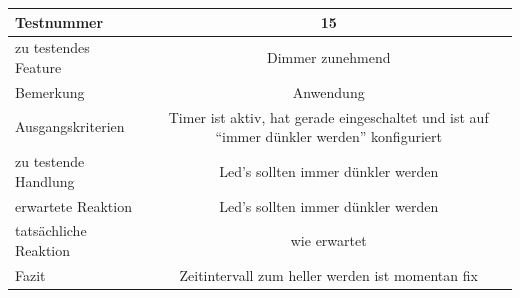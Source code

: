 \documentclass[]{article}
\begin{document}
\begin{longtable}[]{@{}lc@{}}
\toprule
\begin{minipage}[b]{0.25\columnwidth}\raggedright\strut
Testnummer\strut
\end{minipage} & \begin{minipage}[b]{0.55\columnwidth}\centering\strut
15\strut
\end{minipage}\tabularnewline
\midrule
\endhead
\begin{minipage}[t]{0.25\columnwidth}\raggedright\strut
zu testendes Feature\strut
\end{minipage} & \begin{minipage}[t]{0.55\columnwidth}\centering\strut
Dimmer zunehmend\strut
\end{minipage}\tabularnewline
\begin{minipage}[t]{0.25\columnwidth}\raggedright\strut
Bemerkung\strut
\end{minipage} & \begin{minipage}[t]{0.55\columnwidth}\centering\strut
Anwendung\strut
\end{minipage}\tabularnewline
\begin{minipage}[t]{0.25\columnwidth}\raggedright\strut
Ausgangskriterien\strut
\end{minipage} & \begin{minipage}[t]{0.55\columnwidth}\centering\strut
Timer ist aktiv, hat gerade eingeschaltet und ist auf ``immer dünkler
werden'' konfiguriert\strut
\end{minipage}\tabularnewline
\begin{minipage}[t]{0.25\columnwidth}\raggedright\strut
zu testende Handlung\strut
\end{minipage} & \begin{minipage}[t]{0.55\columnwidth}\centering\strut
Led's sollten immer dünkler werden\strut
\end{minipage}\tabularnewline
\begin{minipage}[t]{0.25\columnwidth}\raggedright\strut
erwartete Reaktion\strut
\end{minipage} & \begin{minipage}[t]{0.55\columnwidth}\centering\strut
Led's sollten immer dünkler werden\strut
\end{minipage}\tabularnewline
\begin{minipage}[t]{0.25\columnwidth}\raggedright\strut
tatsächliche Reaktion\strut
\end{minipage} & \begin{minipage}[t]{0.55\columnwidth}\centering\strut
wie erwartet\strut
\end{minipage}\tabularnewline
\begin{minipage}[t]{0.25\columnwidth}\raggedright\strut
Fazit\strut
\end{minipage} & \begin{minipage}[t]{0.55\columnwidth}\centering\strut
Zeitintervall zum heller werden ist momentan fix\strut
\end{minipage}\tabularnewline
\bottomrule
\end{longtable}
\end{document}
